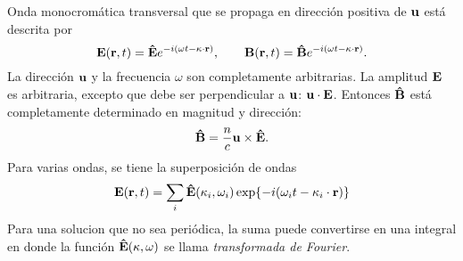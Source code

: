 \begin{tcolorbox}
	Onda monocromática transversal que se propaga en dirección positiva de $\vb{u}$ está descrita por
	\begin{equation}
		\vb{E} (\vb{r},t) = \vu{E} e^{-i(\omega t -\vb{\kappa} \cdot \vb{r})}, \qquad \vb{B} (\vb{r},t) = \vu{B} e^{-i(\omega t - \vb{\kappa} \cdot \vb{r})}.
	\end{equation}
	La dirección $\vb{u}$ y la frecuencia $\omega$ son completamente arbitrarias. La amplitud $\vb{E}$ es arbitraria, excepto que debe ser perpendicular a $\vb{u}$: $\vb{u} \cdot \vb{E}$. Entonces $\vu{B}$ está completamente determinado en magnitud y dirección: 
	\begin{equation}
		\vu{B} = \frac{n}{c} \vb{u} \times \vu{E}.
	\end{equation}
	Para varias ondas, se tiene la superposición de ondas
	\begin{equation}
		\vb{E} (\vb{r},t) = \sum _i \vu{E} (\vb{\kappa} _i,\omega _i) \exp{-i(\omega _i t - \vb{\kappa}_i \cdot \vb{r})}
	\end{equation}
	Para una solucion que no sea periódica, la suma puede convertirse en una integral en donde la función $\vu{E} (\vb{\kappa},\omega)$ se llama \textit{transformada de Fourier}.
\end{tcolorbox}







